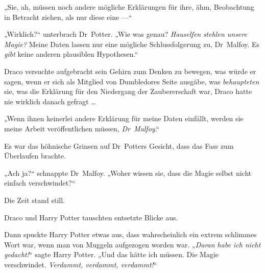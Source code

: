 „Sie, ah, müssen noch andere mögliche Erklärungen für ihre, ähm, Beobachtung in Betracht ziehen, als nur diese eine —“

„Wirklich?“ unterbrach Dr~Potter.
„Wie was genau? \emph{Hauselfen} \emph{stehlen unsere Magie?} Meine Daten lassen nur eine mögliche Schlussfolgerung zu, Dr~Malfoy. Es \emph{gibt} keine anderen plausiblen Hypothesen.“

Draco versuchte aufgebracht sein Gehirn zum Denken zu bewegen, was würde er sagen, wenn er sich als Mitglied von Dumbledores Seite ausgäbe, was \emph{behaupteten} sie, was die Erklärung für den Niedergang der Zaubererschaft war, Draco hatte nie wirklich danach gefragt …

„Wenn ihnen keinerlei andere Erklärung für meine Daten einfällt, werden sie meine Arbeit veröffentlichen müssen, \emph{Dr~Malfoy}.“

Es war das höhnische Grinsen auf Dr~Potters Gesicht, dass das Fass zum Überlaufen brachte.

„Ach ja?“ schnappte Dr~Malfoy.
„Woher wissen sie, dass die Magie selbst nicht einfach verschwindet?“

Die Zeit stand still.

Draco und Harry Potter tauschten entsetzte Blicke aus.

Dann spuckte Harry Potter etwas aus, dass wahrscheinlich ein extrem schlimmes Wort war, wenn man von Muggeln aufgezogen worden war.
„\emph{Daran habe ich nicht gedacht!}“ sagte Harry Potter.
„Und das hätte ich müssen. Die Magie verschwindet. \emph{Verdammt, verdammt, verdammt!}“

